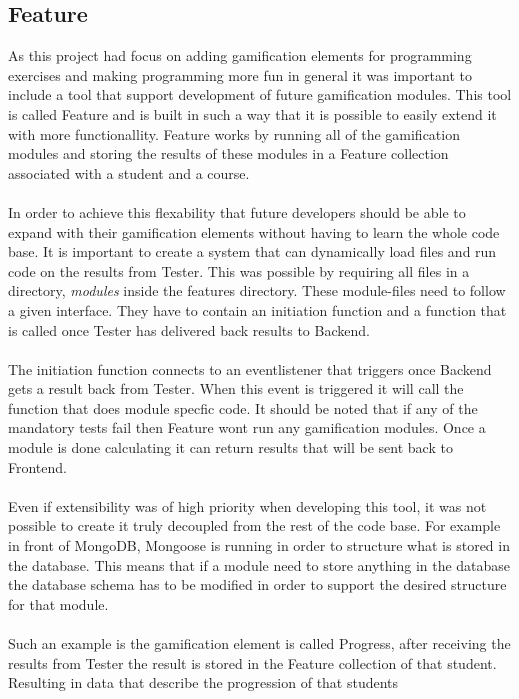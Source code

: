 \subsection{Feature}

As this project had focus on adding gamification elements for programming exercises
and making programming more fun in general it was important to include
a tool that support development of future gamification modules. This tool is called
Feature and is built in such a way that it is possible to easily extend it with more
functionallity. Feature works by running all of the gamification modules and
storing the results of these modules in a Feature collection associated with
a student and a course.\\
\\
In order to achieve this flexability that future developers should be able to expand
with their gamification elements without having to learn the whole code base.
It is important to create a system that can dynamically load files and run
code on the results from Tester. This was possible by requiring all
files in a directory, \textit{modules} inside the features directory. These module-files need to follow
a given interface. They have to contain an initiation function and a function
that is called once Tester has delivered back results to Backend. \\
\\
The initiation function connects to an eventlistener that triggers once Backend
gets a result back from Tester. When this event is triggered it will call the
function that does module specfic code. It should be noted that if any of the
mandatory tests fail then Feature wont run any gamification modules. Once a module
is done calculating it can return results that will be sent back to Frontend.\\
\\
Even if extensibility was of high priority when developing this tool, it was not
possible to create it truly decoupled from the rest of the code base. For example
in front of MongoDB, Mongoose is running in order to structure what is stored in
the database. This means that if a module need to store anything in the database
the database schema has to be modified in order to support the desired structure
for that module.\\
\\
Such an example is the gamification element is called Progress, after
receiving the results from Tester the result is stored in the Feature collection
of that student. Resulting in data that describe the progression of that students
